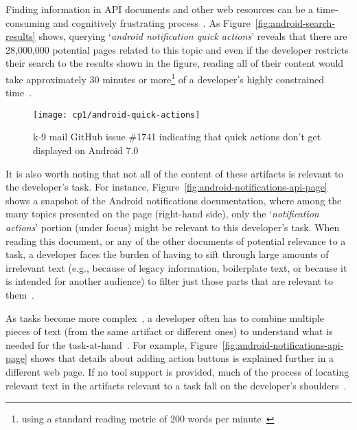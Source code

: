 



Finding information in API documents and other web resources can be a time-consuming
and cognitively frustrating process~\cite{Begel2008,
robillard2011field}. 
As Figure~\ref{fig:android-search-results} shows, querying `\textit{android notification quick actions}'
reveals that there are 28,000,000 potential pages related to this topic
and even if the developer restricts their search to the results shown in the figure, reading all of their content would take approximately 30 minutes or more\footnote{using a standard reading metric of 200 words per minute~\cite{Just1980}} of a developer's highly constrained time~\cite{endrikat2014, Meyer2017}. 


\begin{figure}
    \centering
    \texttt{[image: cp1/android-quick-actions]}
    \caption{k-9 mail GitHub issue \#1741 indicating that quick actions don't get displayed on Android 7.0}
    \label{fig:android-notifications-task}
\end{figure}



It is also worth noting that not all of the content of these artifacts is relevant to the developer's task. 
For instance, Figure~\ref{fig:android-notifications-api-page} shows a snapshot 
of the Android notifications documentation, where among  
the many topics presented on the page (right-hand side), only the `\textit{notification actions}' portion (under focus) might be relevant to this developer's task. 
When reading this document, or any of the other documents of potential relevance to a task, a developer 
faces the burden of having to sift through large amounts of
irrelevant text (e.g., because of legacy information, boilerplate text, or because it is intended for another audience) to filter just those parts that are relevant to them~\cite{Robillard2015}. 



As tasks become more complex~\cite{Pirolli2007, Bystrom1995}, a developer often has to combine multiple pieces of text (from the same artifact or different ones) to understand what is needed for the task-at-hand~\cite{Piorkowski2016}. For example, Figure~\ref{fig:android-notifications-api-page} shows that details about adding
action buttons is explained further in a different web page.
If no tool support is provided, much of the process of locating relevant text in the 
artifacts relevant to a task fall on the developer's shoulders~\cite{gonccalves2011, Ko2006a, Bystrom1995}.


